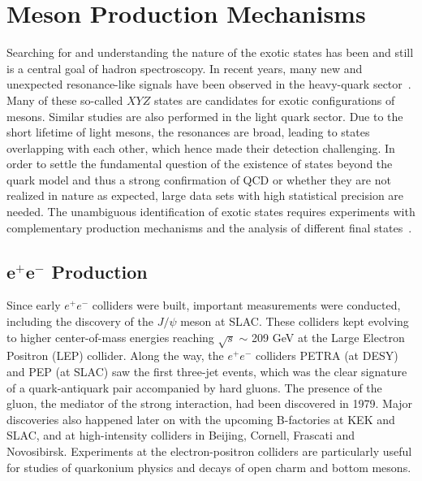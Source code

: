 \section{Meson Production Mechanisms}
\label{p.1.3}

Searching for and understanding the nature of the exotic states has been and still is a central goal of hadron spectroscopy. In recent years, many new and unexpected resonance-like signals have been observed in the heavy-quark sector~\cite{Tanabashi18}. Many of these so-called $XYZ$ states are candidates for exotic configurations of mesons. Similar studies are also performed in the light quark sector. Due to the short lifetime of light mesons, the resonances are broad, leading to states overlapping with each other, which hence made their detection challenging. In order to settle the fundamental question of the existence of states beyond the quark model and thus a strong confirmation of QCD or whether they are not realized in nature as expected, large data sets with high statistical precision are needed. The unambiguous identification of exotic states requires experiments with complementary production mechanisms and the analysis of different final states~\cite{Szczepaniak01}.
 
\subsection{\texorpdfstring{$\bm{e^{+}e^{-}}$}{} Production}

Since early $e^{+}e^{-}$ colliders were built, important measurements were conducted, including the discovery of the $J/\psi$ meson at SLAC. These colliders kept evolving to higher center-of-mass energies reaching $\sqrt{s}$ $\sim$ 209 GeV at the Large Electron Positron (LEP) collider. Along the way, the $e^{+}e^{-}$ colliders PETRA (at DESY) and PEP (at SLAC) saw the first three-jet events, which was the clear signature of a quark-antiquark pair accompanied by hard gluons. The presence of the gluon, the mediator of the strong interaction, had been discovered in 1979. Major discoveries also happened later on with the upcoming B-factories at KEK and SLAC, and at high-intensity colliders in Beijing, Cornell, Frascati and Novosibirsk. Experiments at the electron-positron colliders are particularly useful for studies of quarkonium physics and decays of open charm and bottom mesons.


